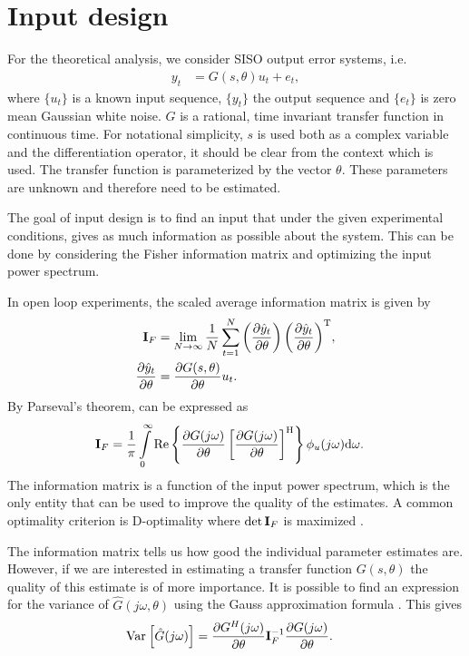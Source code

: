 \section{Input design}\label{sec:inputDesign}
For the theoretical analysis, we consider SISO output error systems, i.e.
\begin{align}
y_t &=G(s,\theta)u_t  + e_t,
\end{align}
where $\{u_t\}$ is a known input sequence, $\{y_t\}$ the output sequence and
$\{e_t\}$ is zero mean Gaussian white noise.
$G$ is a rational, time invariant transfer function in continuous time. For notational simplicity, $s$ is used both as a complex variable and the differentiation operator, it should be clear from the context which is used. The transfer function is parameterized by the vector $\theta$. These parameters are unknown and therefore need to be estimated. 

The goal of input design is to find an input that under the given experimental conditions, gives as much information as possible about the system. This can be done by considering the Fisher information matrix and optimizing the input power spectrum. 

In open loop experiments, the scaled average information matrix is given by
\begin{align}
\mathbf{I}_F & = \lim_{N\rightarrow\infty}
          \frac{1}{N}
            \sum_{t=1}^{N}
              {\left(\frac{\partial\hat{y}_t}{\partial\theta}\right)
               \left(\frac{\partial\hat{y}_t}{\partial\theta}\right)^{\mathrm{T}}},\\
\frac{\partial\hat{y}_t}{\partial\theta}
    & =\frac{\partial G(s,\theta)}{\partial \theta}u_t.
\end{align}
By Parseval's theorem, \IF can be expressed as
\begin{align}
\mathbf{I}_F &= \frac{1}{\pi}
         \int\limits_0^\infty \mathrm{Re}
           \left\{      \frac{\partial G(j\omega)}{\partial \theta}
                  \left[\frac{\partial G(j\omega)}{\partial \theta}\right]^{\mathrm{H}}
           \right\}
           \phi_u(j\omega)
           \mathrm{d}{\omega} \text{.}
\label{eq:IF}
\end{align}
The information matrix is a function of the input power spectrum, which is the only entity that can be used to improve the quality of the estimates. A common optimality criterion is D-optimality where $\det{\ensuremath{\mathbf{I}_F}}$ is maximized \citep{Goodwin1977}.

The information matrix tells us how good the individual parameter estimates are. However, if we are interested in estimating a transfer function $G(s,\theta)$ the quality of this estimate is of more importance. It is possible to find an expression for the variance of $\hat{G}(j\omega,\theta)$ using the Gauss approximation formula \citep{Ljung1999, Pintelon2001}. This gives
\begin{align}
\operatorname{\mathrm{Var}}_{} \left[ \hat{G}(j\omega) \right] &= \frac{\partial G^H(j\omega)}{\partial \theta}\mathbf{I}_F^{-1}\frac{\partial G(j\omega)}{\partial \theta}.
\label{eq:varG}
\end{align}

